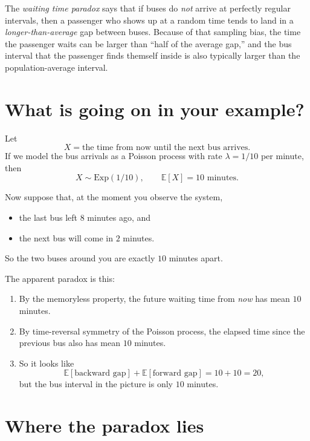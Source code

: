 \begin{eg}
   The \emph{waiting time paradox} says that if buses do \emph{not} arrive at perfectly regular intervals, then a passenger who shows up at a random time tends to land in a \emph{longer-than-average} gap between buses. Because of that sampling bias, the time the passenger waits can be larger than ``half of the average gap,'' and the bus interval that the passenger finds themself inside is also typically larger than the population-average interval.

\section*{What is going on in your example?}

Let
\[
X = \text{the time from now until the next bus arrives}.
\]
If we model the bus arrivals as a Poisson process with rate $\lambda = 1/10$ per minute, then
\[
X \sim \mathrm{Exp}(1/10),
\qquad
\mathbb{E}[X] = 10 \text{ minutes.}
\]

Now suppose that, at the moment you observe the system,

\begin{itemize}[leftmargin=2em]
    \item the last bus left $8$ minutes ago, and
    \item the next bus will come in $2$ minutes.
\end{itemize}

So the two buses around you are exactly $10$ minutes apart.

The apparent paradox is this:

\begin{enumerate}[label=(\arabic*), leftmargin=2em]
    \item By the memoryless property, the future waiting time from \emph{now} has mean $10$ minutes.
    \item By time-reversal symmetry of the Poisson process, the elapsed time since the previous bus also has mean $10$ minutes.
    \item So it looks like
    \[
    \mathbb{E}[\text{backward gap}] + \mathbb{E}[\text{forward gap}] = 10 + 10 = 20,
    \]
    but the bus interval in the picture is only $10$ minutes.
\end{enumerate}

\section*{Where the paradox lies}


\end{eg}
